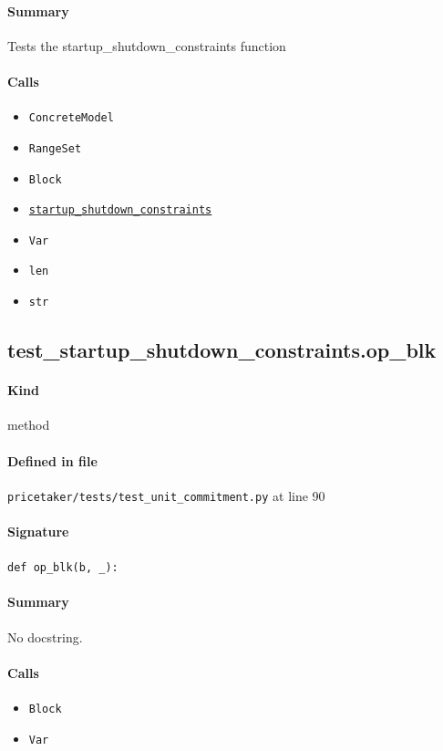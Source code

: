 \documentclass[11pt]{report}
\begin{document}
\paragraph{Summary} Tests the startup\_shutdown\_constraints function
\paragraph{Calls}
\begin{itemize}[leftmargin=*]
  \item \texttt{ConcreteModel}
  \item \texttt{RangeSet}
  \item \texttt{Block}
  \item \hyperref[def:pricetaker-unit_commitment.py:startup_shutdown_constraints:L137]{\texttt{startup\_shutdown\_constraints}}
  \item \texttt{Var}
  \item \texttt{len}
  \item \texttt{str}
\end{itemize}
\subsection{test\_startup\_shutdown\_constraints.op\_blk}
\label{def:pricetaker-tests-test_unit_commitment.py:test_startup_shutdown_constraints.op_blk:L90}
\paragraph{Kind} method
\paragraph{Defined in file} \texttt{pricetaker/tests/test\_unit\_commitment.py} at line 90
\paragraph{Signature} \texttt{def op\_blk(b, \_):}
\paragraph{Summary} No docstring.
\paragraph{Calls}
\begin{itemize}[leftmargin=*]
  \item \texttt{Block}
  \item \texttt{Var}
\end{itemize}
\end{document}
